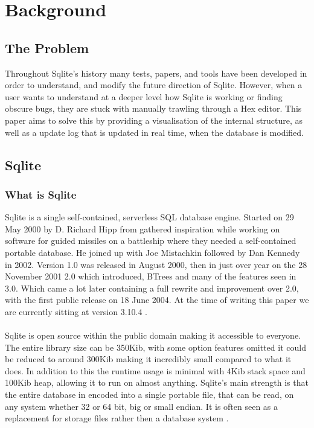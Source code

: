 \section{Background}
\label{sec:background}

\subsection{The Problem}
\label{subsec:the_problem}

Throughout Sqlite's history many tests, papers, and tools have been developed in order to understand, and modify the future direction of Sqlite. However, when a user wants to understand at a deeper level how Sqlite is working or finding obscure bugs, they are stuck with manually trawling through a Hex editor. This paper aims to solve this by providing a visualisation of the internal structure, as well as a update log that is updated in real time, when the database is modified.


\subsection{Sqlite}
\label{subsec:sqlite}

\subsubsection{What is Sqlite}
\label{subsubsec:what_is_sqlite}

Sqlite is a single self-contained, serverless SQL database engine. Started on 29 May 2000 by D. Richard Hipp \citep{sqlite} from gathered inspiration while working on software for guided missiles on a battleship where they needed a self-contained portable database. \citep{sqlitedefguide} He joined up with Joe Mistachkin followed by Dan Kennedy in 2002. Version 1.0 was released in August 2000, then in just over year on the 28 November 2001 2.0 which introduced, BTrees and many of the features seen in 3.0. Which came a lot later containing a full rewrite and improvement over 2.0, with the first public release on 18 June 2004. At the time of writing this paper we are currently sitting at version 3.10.4 \citep{sqlite}.
\\\\
Sqlite is open source within the public domain making it accessible to everyone. The entire library size can be 350Kib, with some option features omitted it could be reduced to around 300Kib making it incredibly small compared to what it does. In addition to this the runtime usage is minimal with 4Kib stack space and 100Kib heap, allowing it to run on almost anything. Sqlite's main strength is that the entire database in encoded into a single portable file, that can be read, on any system whether 32 or 64 bit, big or small endian. It is often seen as a replacement for storage files rather then a database system \citep{sqlite}.

